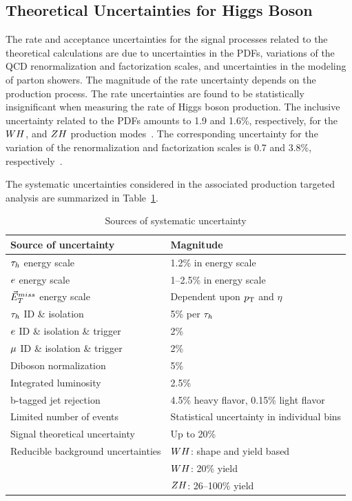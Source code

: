 \subsection{Theoretical Uncertainties for Higgs Boson}
The rate and acceptance uncertainties for the signal processes related to the 
theoretical calculations are due to uncertainties in the PDFs, variations of 
the QCD renormalization and factorization scales, and uncertainties in the 
modeling of parton showers. 
The magnitude of the rate uncertainty depends on the production process.
The rate uncertainties are found to be statistically insignificant when
measuring the rate of Higgs boson production.
The inclusive uncertainty related to the PDFs amounts to 1.9 and 1.6\%, 
respectively, for the $WH$, and $ZH$ production modes~\cite{deFlorian:2016spz}. The
corresponding uncertainty for the variation of the renormalization and 
factorization scales is 0.7 and 3.8\%, respectively~\cite{deFlorian:2016spz}.

The systematic uncertainties considered in the associated production
targeted analysis are summarized in Table~\ref{tab:vh_uncertainties}.

\begin{table}[!ht]
\centering
{}
\begin{tabular}{ll}
Source of uncertainty & Magnitude \\
\hline
 $\tau_{h}$ energy scale                & 1.2\% in energy scale\\
 $e$ energy scale               & 1--2.5\%  in energy scale \\
 $\vec{E}^{miss}_T$ energy scale              & Dependent upon $p_\mathrm{T}$ and $\eta$ \\
 $\tau_{h}$ ID \& isolation & 5\% per $\tau_{h}$  \\
 $e$ ID \& isolation \& trigger  &   2\%  \\
 $\mu$ ID \& isolation \& trigger & 2\%  \\
 Diboson normalization & 5\% \\
 Integrated luminosity     & 2.5\%  \\
 b-tagged jet rejection & 4.5\% heavy flavor, 0.15\% light flavor \\
 Limited number of events                & Statistical uncertainty in individual bins  \\
 Signal theoretical uncertainty  & Up to 20\% \\
 Reducible background uncertainties & $WH$: shape and yield based \\
                                    & $WH$: 20\% yield \\
                                    & $ZH$: 26--100\% yield \\
\hline
\end{tabular}
\caption{Sources of systematic uncertainty}
\label{tab:vh_uncertainties}
\end{table}



